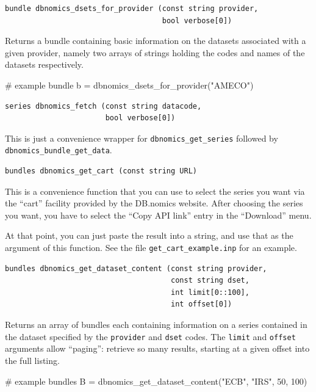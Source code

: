\documentclass{article}
\begin{document}
\begin{funcdoc}
\begin{verbatim}
bundle dbnomics_dsets_for_provider (const string provider,
                                    bool verbose[0])
\end{verbatim}
  Returns a bundle containing basic information on the datasets
  associated with a given provider, namely two arrays of strings
  holding the codes and names of the datasets respectively.
\begin{code}
# example
bundle b = dbnomics_dsets_for_provider("AMECO")
\end{code}
\end{funcdoc}

\begin{funcdoc}
\begin{verbatim}
series dbnomics_fetch (const string datacode,
                       bool verbose[0])
\end{verbatim}
  This is just a convenience wrapper for
  \texttt{dbnomics\_get\_series} followed by
  \texttt{dbnomics\_bundle\_get\_data}.
\end{funcdoc}

\begin{funcdoc}
\begin{verbatim}
bundles dbnomics_get_cart (const string URL)
\end{verbatim}
This is a convenience function that you can use to select the series
you want via the ``cart'' facility provided by the DB.nomics website.
After choosing the series you want, you have to select the ``Copy API
link'' entry in the ``Download'' menu.

At that point, you can just paste the result into a 
string, and use that as the argument of this function. See the
file \texttt{get\_cart\_example.inp} for an example.
\end{funcdoc}

\begin{funcdoc}
\begin{verbatim}
bundles dbnomics_get_dataset_content (const string provider,
                                      const string dset,
                                      int limit[0::100],
                                      int offset[0])
\end{verbatim}
Returns an array of bundles each containing information on a series
contained in the dataset specified by the \texttt{provider} and
\texttt{dset} codes. The \texttt{limit} and \texttt{offset}
arguments allow ``paging'': retrieve so many results, starting at a
given offset into the full listing.
\begin{code}
# example
bundles B = dbnomics_get_dataset_content("ECB", "IRS", 50, 100)
\end{code}
\end{funcdoc}
\end{document}
